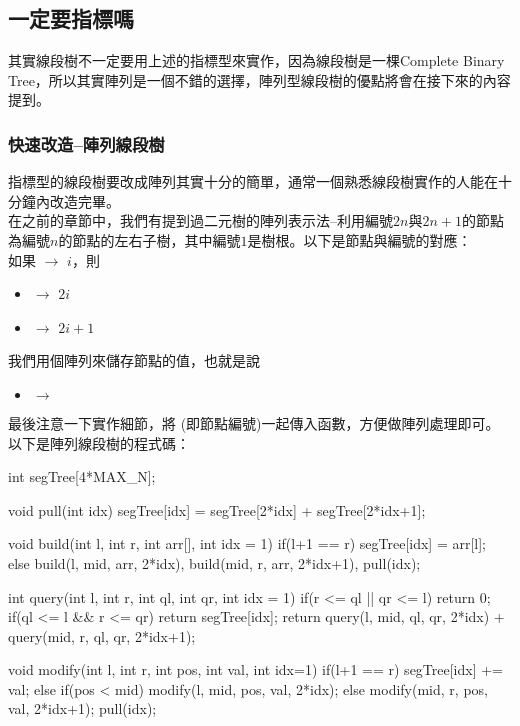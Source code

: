 \subsection{一定要指標嗎}

其實線段樹不一定要用上述的指標型來實作，因為線段樹是一棵Complete Binary Tree，所以其實陣列是一個不錯的選擇，陣列型線段樹的優點將會在接下來的內容提到。

\subsubsection{快速改造--陣列線段樹}

指標型的線段樹要改成陣列其實十分的簡單，通常一個熟悉線段樹實作的人能在十分鐘內改造完畢。\\

在之前的章節中，我們有提到過二元樹的陣列表示法--利用編號$2n$與$2n+1$的節點為編號$n$的節點的左右子樹，其中編號$1$是樹根。以下是節點與編號的對應：\\

如果  $\rightarrow$ $i$，則
\begin{itemize}
\item {} $\rightarrow$ $2i$
\item {} $\rightarrow$ $2i+1$
\end{itemize}

我們用個陣列來儲存節點的值，也就是說

\begin{itemize}
\item {} $\rightarrow$ 
\end{itemize}

最後注意一下實作細節，將  (即節點編號)一起傳入函數，方便做陣列處理即可。\\

以下是陣列線段樹的程式碼：\\

\begin{C++}
int segTree[4*MAX_N];

void pull(int idx){
    segTree[idx] = segTree[2*idx] + segTree[2*idx+1];
}

void build(int l, int r, int arr[], int idx = 1){
    if(l+1 == r) segTree[idx] = arr[l];
    else build(l, mid, arr, 2*idx), 
        build(mid, r, arr, 2*idx+1), pull(idx);
}

int query(int l, int r, int ql, int qr, int idx = 1){
    if(r <= ql || qr <= l) return 0;
    if(ql <= l && r <= qr) return segTree[idx];
    return query(l, mid, ql, qr, 2*idx) + 
           query(mid, r, ql, qr, 2*idx+1);
}

void modify(int l, int r, int pos, int val, int idx=1){
    if(l+1 == r) segTree[idx] += val;
    else if(pos < mid) modify(l, mid, pos, val, 2*idx);
    else modify(mid, r, pos, val, 2*idx+1);
    pull(idx);
}
\end{C++}

